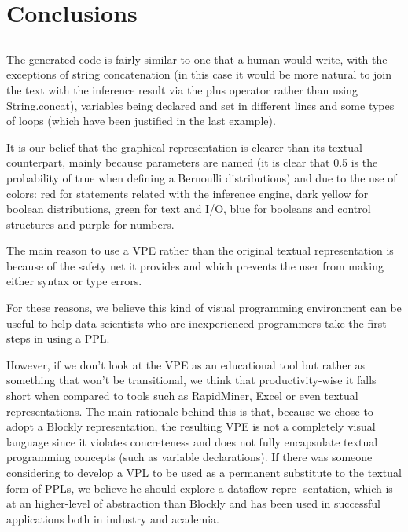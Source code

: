 \chapter{Conclusions} \label{chap:concl}

\section*{}

The generated code is fairly similar to one that a human would write, with the exceptions of string
concatenation (in this case it would be more natural to join the text with the inference result via the
plus operator rather than using String.concat), variables being declared and set in different lines
and some types of loops (which have been justified in the last example).

It is our belief that the graphical representation is clearer than its textual counterpart, mainly
because parameters are named (it is clear that 0.5 is the probability of true when defining a
Bernoulli distributions) and due to the use of colors: red for statements related with the inference
engine, dark yellow for boolean distributions, green for text and I/O, blue for booleans and
control structures and purple for numbers.

The main reason to use a VPE rather than the original textual representation is because of the
safety net it provides and which prevents the user from making either syntax or type errors.

For these reasons, we believe this kind of visual programming environment can be useful to
help data scientists who are inexperienced programmers take the first steps in using a PPL.

However, if we don’t look at the VPE as an educational tool but rather as something that
won’t be transitional, we think that productivity-wise it falls short when compared to tools such as
RapidMiner, Excel or even textual representations. The main rationale behind this is that, because
we chose to adopt a Blockly representation, the resulting VPE is not a completely visual language
since it violates concreteness and does not fully encapsulate textual programming concepts (such
as variable declarations). If there was someone considering to develop a VPL to be used as a
permanent substitute to the textual form of PPLs, we believe he should explore a dataflow repre-
sentation, which is at an higher-level of abstraction than Blockly and has been used in successful
applications both in industry and academia.

